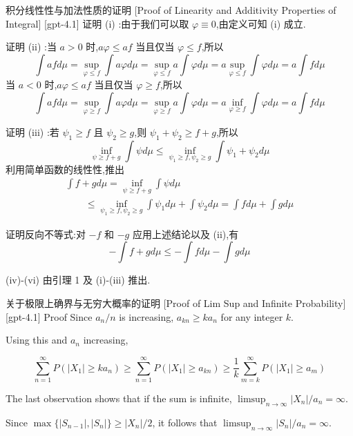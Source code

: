 \documentclass[UTF8]{ctexart}
\begin{document}
    
    
    \begin{prf}
        {积分线性性与加法性质的证明}
        [Proof of Linearity and Additivity Properties of Integral]
        [gpt-4.1]
        证明 (i) :由于我们可以取 $\varphi \equiv 0$,由定义可知 (i) 成立.

证明 (ii) :当 $a > 0$ 时,$a \varphi \leq a f$ 当且仅当 $\varphi \leq f$,所以
\[
\int a f d \mu = \operatorname*{sup}_{\varphi \leq f} \int a \varphi d \mu = \operatorname*{sup}_{\varphi \leq f} a \int \varphi d \mu = a \operatorname*{sup}_{\varphi \leq f} \int \varphi d \mu = a \int f d \mu
\]
当 $a < 0$ 时,$a \varphi \leq a f$ 当且仅当 $\varphi \geq f$,所以
\[
\int a f d \mu = \operatorname*{sup}_{\varphi \geq f} \int a \varphi d \mu = \operatorname*{sup}_{\varphi \geq f} a \int \varphi d \mu = a \operatorname*{inf}_{\varphi \geq f} \int \varphi d \mu = a \int f d \mu
\]

证明 (iii) :若 $\psi _ { 1 } \geq f$ 且 $\psi _ { 2 } \geq g$,则 $\psi _ { 1 } + \psi _ { 2 } \geq f + g$,所以
\[
\operatorname*{inf}_{\psi \geq f + g} \int \psi d \mu \leq \operatorname*{inf}_{\psi_{1} \geq f, \psi_{2} \geq g} \int \psi_{1} + \psi_{2} d \mu
\]
利用简单函数的线性性,推出
\[
\begin{array}{l}
\int f + g d \mu = \operatorname*{inf}_{\psi \geq f + g} \int \psi d \mu \\
\qquad \leq \operatorname*{inf}_{\psi_{1} \geq f, \psi_{2} \geq g} \int \psi_{1} d \mu + \int \psi_{2} d \mu = \int f d \mu + \int g d \mu
\end{array}
\]

证明反向不等式:对 $-f$ 和 $-g$ 应用上述结论以及 (ii),有
\[
- \int f + g d \mu \leq - \int f d \mu - \int g d \mu
\]

(iv)-(vi) 由引理 1 及 (i)-(iii) 推出.

    \end{prf}
    
    
    
    \begin{prf}
        {关于极限上确界与无穷大概率的证明}
        [Proof of Lim Sup and Infinite Probability]
        [gpt-4.1]
        Proof Since $a_{n} / n$ is increasing, $a_{kn} \geq k a_{n}$ for any integer $k$.

Using this and $a_{n}$ increasing,

\[
\sum_{n=1}^{\infty} P ( | X_{1} | \geq k a_{n} ) \geq \sum_{n=1}^{\infty} P ( | X_{1} | \geq a_{kn} ) \geq \frac{1}{k} \sum_{m=k}^{\infty} P ( | X_{1} | \geq a_{m} )
\]

The last observation shows that if the sum is infinite, $\limsup_{n \to \infty} | X_{n} | / a_{n} = \infty$.

Since $\max \{ | S_{n-1} |, | S_{n} | \} \geq | X_{n} | / 2$, it follows that $\limsup_{n \to \infty} | S_{n} | / a_{n} = \infty$.
    \end{prf}
    
\end{document}
